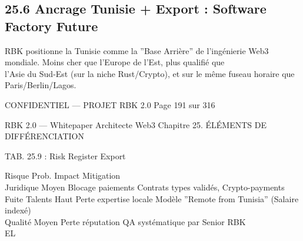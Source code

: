 \documentclass[12pt,landscape,a4paper]{article}
\newenvironment{confidential}
{\begin{tcolorbox}[
    colback=rbkred!5!white,
    colframe=rbkred!75!black,
    title=CONFIDENTIEL,
    fonttitle=\bfseries\color{white},
    coltitle=rbkred!75!black,
    breakable,
    enhanced,
    frame hidden,
    borderline west={2pt}{0pt}{rbkred!75!black}
]}
{\end{tcolorbox}}
\begin{document}
\subsection{25.6 Ancrage Tunisie + Export : Software Factory Future}
RBK positionne la Tunisie comme la ”Base Arrière” de l’ingénierie Web3 mondiale. Moins cher que l’Europe de l’Est, plus qualifié que\\
l’Asie du Sud-Est (sur la niche Rust/Crypto), et sur le même fuseau horaire que Paris/Berlin/Lagos.\\
\vspace{0.5em}
\vspace{0.5em}
\vspace{0.5em}
\vspace{0.5em}
\begin{confidential}CONFIDENTIEL — PROJET RBK 2.0                               Page 191 sur 316\end{confidential}
RBK 2.0 — Whitepaper Architecte Web3                                                              Chapitre 25. ÉLÉMENTS DE DIFFÉRENCIATION\\
\vspace{0.5em}
\vspace{0.5em}
\begin{center}\begin{tabular}TAB. 25.9 : Risk Register Export\end{tabular}\end{center}
\vspace{0.5em}
\vspace{0.5em}
Risque          Prob.   Impact               Mitigation\\
\vspace{0.5em}
Juridique       Moyen Blocage paiements      Contrats types validés, Crypto-payments\\
\vspace{0.5em}
Fuite Talents Haut      Perte expertise locale Modèle ”Remote from Tunisia” (Salaire indexé)\\
\vspace{0.5em}
Qualité         Moyen Perte réputation       QA systématique par Senior RBK\\
\vspace{0.5em}
\vspace{0.5em}
\vspace{0.5em}
\vspace{0.5em}
EL\\
\end{document}
